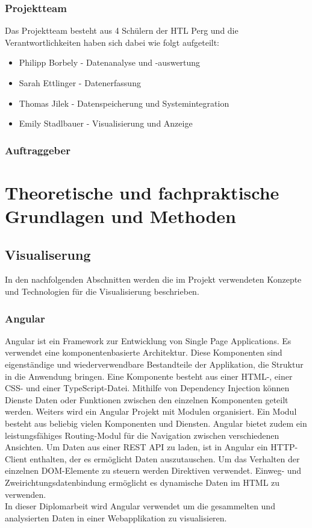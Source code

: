 \documentclass{report}
\begin{document}
\subsection{Projektteam}
Das Projektteam besteht aus 4 Schülern der HTL Perg und die Verantwortlichkeiten haben sich dabei wie folgt aufgeteilt:
\begin{itemize}
    \item Philipp Borbely - Datenanalyse und -auswertung
    \item Sarah Ettlinger - Datenerfassung
    \item Thomas Jilek - Datenspeicherung und Systemintegration
    \item Emily Stadlbauer - Visualisierung und Anzeige
\end{itemize}

\subsection{Auftraggeber}

\chapter{Theoretische und fachpraktische Grundlagen und Methoden}
\section{Visualiserung}
 In den nachfolgenden Abschnitten werden die im Projekt verwendeten Konzepte und Technologien  für die Visualisierung beschrieben.
\subsection{Angular}
Angular ist ein Framework zur Entwicklung von Single Page Applications. Es verwendet eine komponentenbasierte Architektur. Diese Komponenten sind eigenständige und wiederverwendbare Bestandteile  der Applikation, die Struktur in die Anwendung bringen. Eine Komponente besteht aus einer HTML-, einer CSS- und einer TypeScript-Datei. Mithilfe von Dependency Injection können Dienste Daten oder Funktionen  zwischen den einzelnen Komponenten geteilt werden. Weiters wird ein Angular Projekt mit Modulen organisiert. Ein Modul besteht aus beliebig vielen Komponenten und Diensten. Angular bietet zudem ein leistungsfähiges Routing-Modul für die Navigation zwischen verschiedenen Ansichten. Um Daten aus einer REST API zu laden, ist in Angular ein HTTP-Client enthalten, der es ermöglicht Daten auszutauschen. Um das Verhalten der einzelnen DOM-Elemente zu steuern werden Direktiven verwendet.
Einweg- und Zweirichtungsdatenbindung ermöglicht es dynamische Daten im HTML zu verwenden.
\\In dieser Diplomarbeit wird Angular verwendet um die gesammelten und analysierten Daten in einer Webapplikation zu visualisieren.
\end{document}
